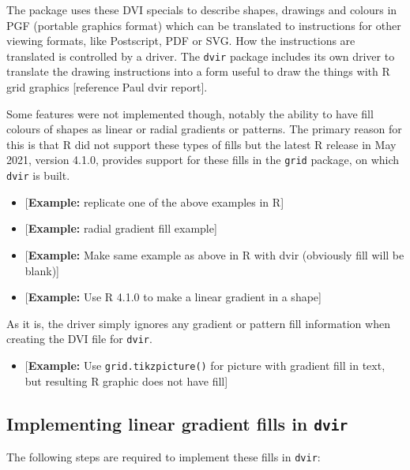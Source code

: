 \documentclass[]{article}
\providecommand{\tightlist}{%
  \setlength{\itemsep}{0pt}\setlength{\parskip}{0pt}}
\begin{document}
The \Tikz{} package uses these DVI specials to describe shapes, drawings
and colours in PGF (portable graphics format) which can be translated to
instructions for other viewing formats, like Postscript, PDF or SVG. How
the instructions are translated is controlled by a \Tikz{} driver. The
\texttt{dvir} package includes its own \Tikz{} driver to translate the
drawing instructions into a form useful to draw the things with R grid
graphics {[}reference Paul dvir \Tikz{} report{]}.

Some \Tikz{} features were not implemented though, notably the ability
to have fill colours of shapes as linear or radial gradients or
patterns. The primary reason for this is that R did not support these
types of fills but the latest R release in May 2021, version 4.1.0,
provides support for these fills in the \texttt{grid} package, on which
\texttt{dvir} is built.

\begin{itemize}
\item
  {[}\textbf{Example:} replicate one of the above examples in R{]}
\item
  {[}\textbf{Example:} \Tikz{} radial gradient fill example{]}
\item
  {[}\textbf{Example:} Make same \Tikz{} example as above in R with dvir
  (obviously fill will be blank){]}
\item
  {[}\textbf{Example:} Use R 4.1.0 to make a linear gradient in a
  shape{]}
\end{itemize}

As it is, the \Tikz{} driver simply ignores any gradient or pattern fill
information when creating the DVI file for \texttt{dvir}.

\begin{itemize}
\tightlist
\item
  {[}\textbf{Example:} Use \texttt{grid.tikzpicture()} for picture with
  gradient fill in text, but resulting R graphic does not have fill{]}
\end{itemize}

\subsection{\texorpdfstring{Implementing \Tikz{} linear gradient fills
in
\texttt{dvir}\label{tikzWorkflow}}{Implementing  linear gradient fills in dvir}}\label{implementing-linear-gradient-fills-in-dvir}

The following steps are required to implement these \Tikz{} fills in
\texttt{dvir}:
\end{document}
